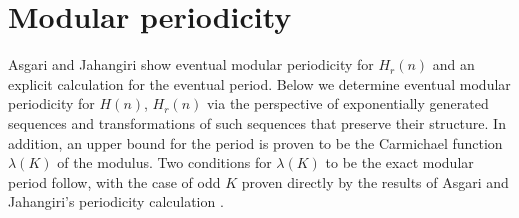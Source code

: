 \documentclass[12pt,reqno]{article}
\begin{document}
\section{Modular periodicity}
Asgari and Jahangiri \cite{cc:asgari} show eventual modular periodicity for $H_{r}(n)$ and an explicit calculation for the eventual period. Below we determine eventual modular periodicity for $H(n)$, $H_{r}(n)$ via the perspective of exponentially generated sequences and transformations of such sequences that preserve their structure. In addition, an upper bound for the period is proven to be the Carmichael function $\lambda(K)$ of the modulus. Two conditions for $\lambda(K)$ to be the exact modular period follow, with the case of odd $K$ proven directly by the results of Asgari and Jahangiri's periodicity calculation \cite{cc:asgari}.
\end{document}
